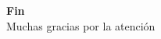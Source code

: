 \begin{frame}[plain]
  \centering
  {\Huge \textbf{Fin}}\\[6mm]
  {\large Muchas gracias por la atención}
\end{frame}


